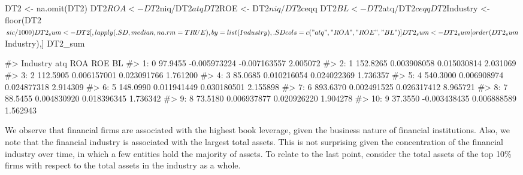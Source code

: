 \begin{Schunk}
\begin{Sinput}
DT2 <- na.omit(DT2)
DT2$ROA <- DT2$niq/DT2$atq
DT2$ROE <- DT2$niq/DT2$ceqq
DT2$BL <- DT2$atq/DT2$ceqq
DT2$Industry <- floor(DT2$sic/1000)

DT2_sum <- DT2[,lapply(.SD,median,na.rm = TRUE), by = list(Industry),
               .SDcols = c("atq","ROA","ROE","BL")]
DT2_sum <- DT2_sum[order(DT2_sum$Industry),]
DT2_sum
\end{Sinput}
\begin{Soutput}
#>     Industry      atq          ROA          ROE       BL
#>  1:        0  97.9455 -0.005973224 -0.007163557 2.005072
#>  2:        1 152.8265  0.003908058  0.015030814 2.031069
#>  3:        2 112.5905  0.006157001  0.023091766 1.761200
#>  4:        3  85.0685  0.010216054  0.024022369 1.736357
#>  5:        4 540.3000  0.006908974  0.024877318 2.914309
#>  6:        5 148.0990  0.011941449  0.030180501 2.155898
#>  7:        6 893.6370  0.002491525  0.026317412 8.965721
#>  8:        7  88.5455  0.004830920  0.018396345 1.736342
#>  9:        8  73.5180  0.006937877  0.020926220 1.904278
#> 10:        9  37.3550 -0.003438435  0.006888589 1.562943
\end{Soutput}
\end{Schunk}
We observe that financial firms are associated with the highest book leverage,
given the business nature of financial institutions. Also, we note that
the financial industry is associated with the largest total assets. This
is not surprising given the concentration of the financial industry over
time, in which a few entities hold the majority of assets. To relate to
the last point, consider the total assets of the top 10\% firms with
respect to the total assets in the industry as a whole.

